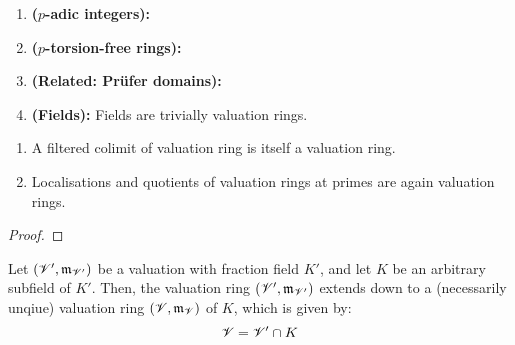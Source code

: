                 \begin{example} \label{example: valuation_rings}
                    \noindent
                    \begin{enumerate}
                        \item \textbf{($p$-adic integers):}
                        \item \textbf{($p$-torsion-free rings):}
                        \item \textbf{(Related: Pr\"ufer domains):}
                        \item \textbf{(Fields):} Fields are trivially valuation rings. 
                    \end{enumerate}
                \end{example}
                
                \begin{proposition} \label{prop: colimits_of_valuation_rings}
                    \noindent
                    \begin{enumerate}
                        \item A filtered colimit of valuation ring is itself a valuation ring.
                        \item Localisations and quotients of valuation rings at primes are again valuation rings. 
                    \end{enumerate}
                \end{proposition}
                    \begin{proof}
                        
                    \end{proof}
                    
                \begin{proposition} \label{prop: extensions of valuation rings}
                    Let $(\mathscr{V}', \mathfrak{m}_{\mathscr{V}'})$ be a valuation with fraction field $K'$, and let $K$ be an arbitrary subfield of $K'$. Then, the valuation ring $(\mathscr{V}', \mathfrak{m}_{\mathscr{V}'})$ extends down to a (necessarily unqiue) valuation ring $(\mathscr{V}, \mathfrak{m}_{\mathscr{V}})$ of $K$, which is given by:
                        $$\mathscr{V} = \mathscr{V}' \cap K$$
                \end{proposition}
            

